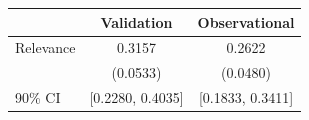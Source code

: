 \begin{tabular}{l | cc}
\toprule
 & Validation & Observational \\
\midrule
  Relevance & 0.3157 & 0.2622 \\
            & (0.0533) & (0.0480) \\
  90\% CI  & [0.2280, 0.4035] & [0.1833, 0.3411] \\
\bottomrule
\end{tabular}
